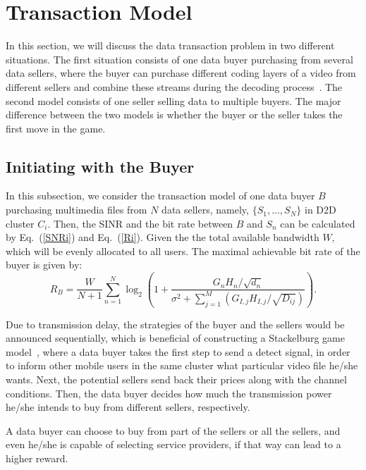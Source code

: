 \documentclass[11pt,draftcls]{IEEEtran}{\onecolumn}
\begin{document}
\section{Transaction Model}

In this section, we will discuss the data transaction problem in two different situations. The first situation consists of one data buyer purchasing from several data sellers, where the buyer can purchase different coding layers of a video from different sellers and combine these streams during the decoding process~\cite{200}. The second model consists of one seller selling data to multiple buyers. The major difference between the two models is whether the buyer or the seller takes the first move in the game.

\subsection{Initiating with the Buyer}

In this subsection, we consider the transaction model of one data buyer $B$ purchasing multimedia files from $N$ data sellers, namely, $\{S_1,\ldots,S_N\}$ in D2D cluster $C_{i}$. Then, the SINR and the bit rate between $B$ and $S_n$ can be calculated by Eq.~(\ref{SNRi}) and Eq.~(\ref{Ri}). Given the the total available bandwidth $W$, which will be evenly allocated to all users. The maximal achievable bit rate of the buyer is given by:
\begin{equation}
R_B=\frac{W}{N+1}\sum_{n=1}^N\log_2\left(1+\frac{{{G}_{n}}H_{n}/\sqrt{{{d}_{n}}}}{{{\sigma }^{2}}+\sum\limits_{j=1}^{M}{({G_{I,j}}H_{I,j}/\sqrt{{{D}_{ij}}})}}\right).
\end{equation}

Due to transmission delay, the strategies of the buyer and the sellers would be announced sequentially, which is beneficial of constructing a Stackelburg game model~\cite{simaan1976stackelberg}, where a data buyer takes the first step to send a detect signal, in order to inform other mobile users in the same cluster what particular video file he/she wants. Next, the potential sellers send back their prices along with the channel conditions. Then, the data buyer decides how much the transmission power he/she intends to buy from different sellers, respectively.

A data buyer can choose to buy from part of the sellers or all the sellers, and even he/she is capable of selecting service providers, if that way can lead to a higher reward.
\end{document}
